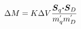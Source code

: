 \begin{equation}                              
\Delta M = K \Delta V \frac{\mbox{\boldmath $S$}_{q}                                
\mbox{\boldmath $\cdot S$}_{D}}{m_{q}^{'} m_{D}^{'}}                              
\end{equation} 
